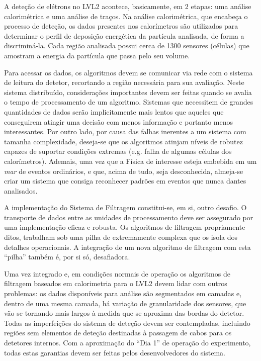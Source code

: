 A deteção de elétrons no LVL2 acontece, basicamente, em 2 etapas: uma análise
calorimétrica e uma análise de traços. Na análise calorimétrica, que encabeça
o processo de deteção, os dados presentes nos calorímetros são utilizados para
determinar o perfil de deposição energética da partícula analisada, de forma a
discriminá-la. Cada região analisada possui cerca de 1300 sensores (células)
que amostram a energia da partícula que passa pelo seu volume.

Para acessar os dados, os algoritmos devem se comunicar via rede com o sistema
de leitura do detetor, recortando a região necessária para sua
avaliação. Neste sistema distribuído, considerações importantes devem ser
feitas quando se avalia o tempo de processamento de um algoritmo. Sistemas que
necessitem de grandes quantidades de dados serão implicitamente mais lentos
que aqueles que conseguirem atingir uma decisão com menos informação e
portanto menos interessantes. Por outro lado, por causa das falhas inerentes a
um sistema com tamanha complexidade, deseja-se que os algoritmos atinjam
níveis de robutez capazes de suportar condições extremas (e.g. falha de
algumas células dos calorímetros). Ademais, uma vez que a Física de interesse
esteja embebida em um \textit{mar} de eventos ordinários, e que, acima de
tudo, seja desconhecida, almeja-se criar um sistema que consiga reconhecer
padrões em eventos que nunca dantes analisados.

A implementação do Sistema de Filtragem constitui-se, em si, outro desafio. O
transporte de dados entre as unidades de processamento deve ser assegurado por
uma implementação eficaz e robusta. Os algoritmos de filtragem propriamente
ditos, trabalham sob uma pilha de  extremamente complexa que os
isola dos detalhes operacionais. A integração de um nova algoritmo de
filtragem com esta ``pilha'' também é, por si só, desafiadora.

Uma vez integrado e, em condições normais de operação os algoritmos de
filtragem baseados em calorimetria para o LVL2 devem lidar com outros
problemas: os dados disponíveis para análise são segmentados em camadas e,
dentro de uma mesma camada, há variação de granularidade dos sensores, que vão
se tornando mais largos à medida que se aproxima das bordas do detetor. Todas
as imperfeições do sistema de deteção devem ser contempladas, incluindo
regiões sem elementos de deteção destinadas à passagem de cabos para os
detetores internos. Com a aproximação do ``Dia 1'' de operação do experimento,
todas estas garantias devem ser feitas pelos desenvolvedores do sistema.

